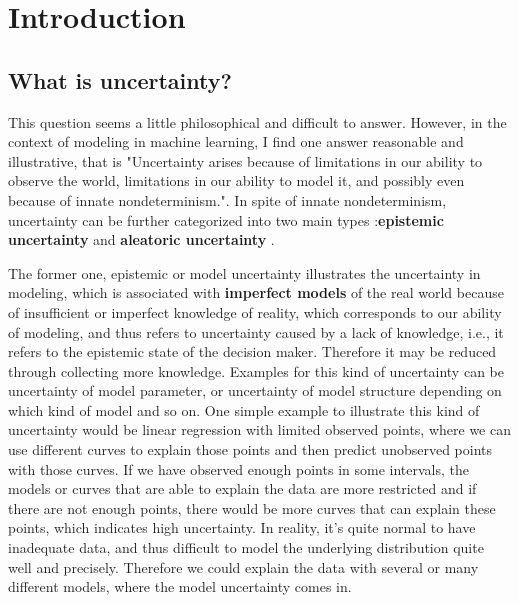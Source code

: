 \chapter{Introduction}
\setcounter{page}{1}%
\thispagestyle{empty}

\section{What is uncertainty?}
This question seems a little philosophical and difficult to answer. However, in the context of modeling in machine learning, I find one answer reasonable and illustrative, that is "Uncertainty arises because of limitations in our ability to observe the world, limitations in our ability to model it, and possibly even because of innate nondeterminism."\cite{koller2009probabilistic}. In spite of innate nondeterminism, uncertainty can be further categorized into two main types :\textbf{epistemic uncertainty} and \textbf{aleatoric uncertainty} \cite{der2009aleatory}\cite{senge2014reliable} \cite{kendall2017uncertainties}. 

The former one, epistemic or model uncertainty illustrates the uncertainty in modeling, which is associated with \textbf{imperfect models} of the real world because of insufficient or imperfect knowledge of reality, which corresponds to our ability of modeling, and thus refers to uncertainty caused by a lack of knowledge, i.e., it refers to the epistemic state of the decision maker. Therefore it may be reduced through collecting more knowledge. Examples for this kind of uncertainty can be uncertainty of model parameter, or uncertainty of model structure depending on which kind of model and so on. One simple example to illustrate this kind of uncertainty would be linear regression with limited observed points, where we can use different curves to explain those points and then predict unobserved points with those curves. If we have observed enough points in some intervals, the models or curves that are able to explain the data are more restricted and if there are not enough points, there would be more curves that can explain these points, which indicates high uncertainty. In reality, it's quite normal to have inadequate data, and thus difficult to model the underlying distribution quite well and precisely. Therefore we could explain the data with several or many different models, where the model uncertainty comes in.

